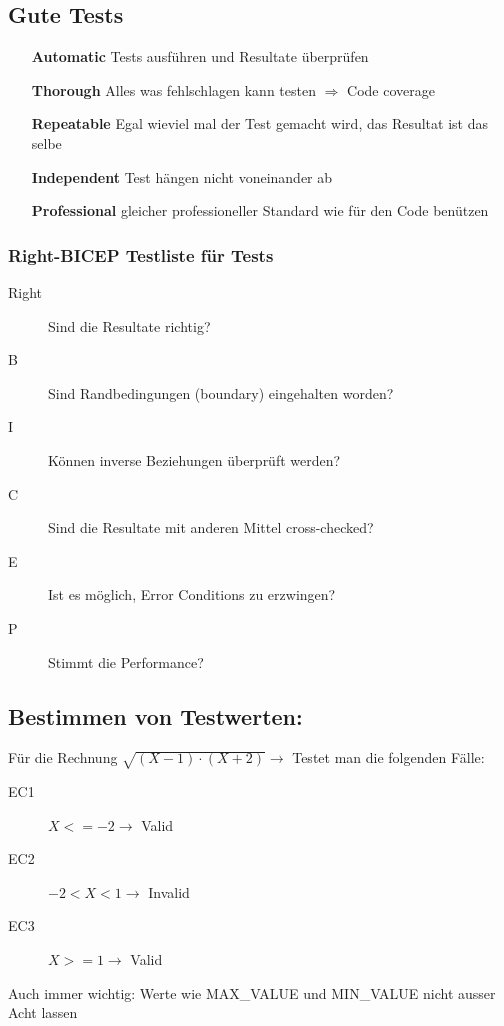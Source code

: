\documentclass[a4paper,10pt]{article}
\newcommand{\Bold}[1]{\textbf{#1}} %
\newcommand{\Ra}{\Rightarrow}
\begin{document}
\subsection{Gute Tests}
\begin{itemize}
	\item[\Bold {Automatic}] Tests ausf\"uhren und Resultate \"uberpr\"ufen
	\item[\Bold {Thorough}] Alles was fehlschlagen kann testen $\Ra$ Code coverage
	\item[\Bold {Repeatable}] Egal wieviel mal der Test gemacht wird, das Resultat ist das selbe
	\item[\Bold {Independent}] Test h\"angen nicht voneinander ab
	\item[\Bold {Professional}] gleicher professioneller Standard wie f\"ur den Code ben\"utzen
\end{itemize}

\subsubsection{Right-BICEP Testliste f\"{u}r Tests}
\begin{description}
\item [Right] Sind die Resultate richtig?
\item [B] Sind Randbedingungen (boundary) eingehalten worden?
\item [I]K\"{o}nnen inverse Beziehungen \"{u}berpr\"{u}ft werden?
\item [C] Sind die Resultate mit anderen Mittel cross-checked?
\item [E] Ist es m\"{o}glich, Error Conditions zu erzwingen?
\item [P]Stimmt die Performance?
\end{description}

\subsection{Bestimmen von Testwerten:}
F\"{u}r die Rechnung $\sqrt{(X-1)\cdot(X+2)}\to$ Testet man die folgenden F\"{a}lle:
\begin{description}
\item[EC1] $X<=-2\to$ Valid
\item[EC2] $-2<X<1\to$ Invalid
\item[EC3] $X>=1\to$ Valid
\end{description}
Auch immer wichtig: Werte wie MAX\_$ $VALUE und MIN\_$ $VALUE nicht ausser Acht lassen
\end{document}
